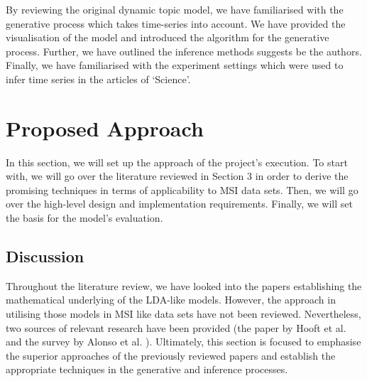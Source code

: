 \documentclass{mprop}
\begin{document}
\par By reviewing the original dynamic topic model, we have familiarised with the generative process which takes time-series into account. We have provided the visualisation of the model and introduced the algorithm for the generative process. Further, we have outlined the inference methods suggests be the authors. Finally, we have familiarised with the experiment settings which were used to infer time series in the articles of `Science'. 

\section{Proposed Approach}

\par In this section, we will set up the approach of the project's execution. To start with, we will go over the literature reviewed in Section 3 in order to derive the promising techniques in terms of applicability to MSI data sets. Then, we will go over the high-level design and implementation requirements. Finally, we will set the basis for the model's evaluation. 


\subsection{Discussion}

\par Throughout the literature review, we have looked into the papers establishing the mathematical underlying of the LDA-like models. However, the approach in utilising those models in MSI like data sets have not been reviewed. Nevertheless, two sources of relevant research have been provided (the paper by Hooft et al. \cite{hooft} and the survey by Alonso et al. \cite{alonso-et-al}). Ultimately, this section is focused to emphasise the superior approaches of the previously reviewed papers and establish the appropriate techniques in the generative and inference processes.
\end{document}
